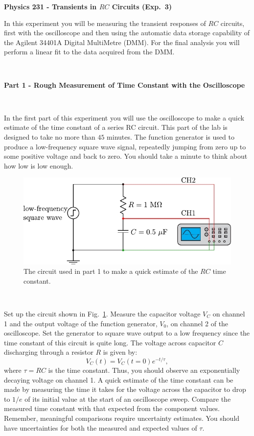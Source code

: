 \documentclass[12pt,oneside,openany,letterpaper]{article}
\begin{document}
\thispagestyle{plain}
\begin{center}
{\large{\bf{\selectfont Physics 231 - Transients in $RC$ Circuits (Exp.~3)}}}
\end{center}

\noindent In this experiment you will be measuring the transient responses of $RC$ circuits, first with the oscilloscope and then using the automatic data storage capability of the Agilent 34401A Digital MultiMetre (DMM). For the final analysis you will perform a linear fit to the data acquired from the DMM.

~


{\bf Part 1 - Rough Measurement of Time Constant with the Oscilloscope}

~

\noindent In the first part of this experiment you will use the oscilloscope to make a quick estimate of the time constant of a series RC circuit.  This part of the lab is designed to take no more than $45$ minutes. The function generator is used to produce a low-frequency square wave signal, repeatedly jumping from zero up to some positive voltage and back to zero.  You should take a minute to think about how low is low enough.  
\begin{figure}[h!]
\begin{center}
\includegraphics[width=.6\textwidth]{figures/Lab3Fig1.pdf}\caption{\label{fig:fig1}The circuit used in part 1 to make a quick estimate of the $RC$ time constant.}
\end{center}
\end{figure}

~

\noindent Set up the circuit shown in Fig.~\ref{fig:fig1}. Measure the capacitor voltage $V_C$ on channel 1 and the output voltage of the function generator, $V_0$, on channel 2 of the oscilloscope. Set the
generator to square wave output to a low frequency since the time constant of this circuit is quite long.  The voltage across capacitor $C$ discharging through a resistor $R$ is given by:
\begin{equation}
V_C(t) = V_C(t=0)e^{-t/\tau},
\end{equation}
where $\tau = RC$ is the time constant. Thus, you should observe an exponentially decaying voltage on channel 1. A quick estimate of the time constant can be made by measuring the time it takes for the voltage across the capacitor to drop to $1/e$ of its initial value at the start of an oscilloscope sweep. Compare the measured time constant with that expected from the component values. Remember, meaningful comparisons require uncertainty estimates.  You should have uncertainties for both the measured and expected values of $\tau$.
\end{document}
